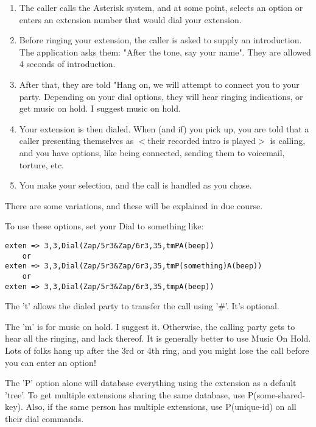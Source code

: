 \begin{enumerate}
\item The caller calls the Asterisk system, and at some point, selects an
option or enters an extension number that would dial your extension.

\item Before ringing your extension, the caller is asked to supply an
introduction. The application asks them: "After the tone, say your
name". They are allowed 4 seconds of introduction.

\item After that, they are told "Hang on, we will attempt to connect you
to your party. Depending on your dial options, they will hear ringing
indications, or get music on hold. I suggest music on hold.

\item Your extension is then dialed. When (and if) you pick up, you are
told that a caller presenting themselves as $<$their recorded intro is
played$>$ is calling, and you have options, like being connected,
sending them to voicemail, torture, etc.

\item You make your selection, and the call is handled as you chose.
\end{enumerate}

There are some variations, and these will be explained in due course.


To use these options, set your Dial to something like:
\begin{verbatim}
exten => 3,3,Dial(Zap/5r3&Zap/6r3,35,tmPA(beep))
    or
exten => 3,3,Dial(Zap/5r3&Zap/6r3,35,tmP(something)A(beep))
    or
exten => 3,3,Dial(Zap/5r3&Zap/6r3,35,tmpA(beep))
\end{verbatim}

The 't' allows the dialed party to transfer the call using '\#'. It's
optional.

The 'm' is for music on hold. I suggest it. Otherwise, the calling
party gets to hear all the ringing, and lack thereof. It is generally
better to use Music On Hold. Lots of folks hang up after the 3rd or
4th ring, and you might lose the call before you can enter an option!

The 'P' option alone will database everything using the extension as a
default 'tree'. To get multiple extensions sharing the same database, use
P(some-shared-key). Also, if the same person has multiple extensions,
use P(unique-id) on all their dial commands.

